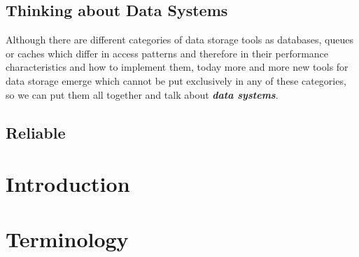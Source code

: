 \documentclass{article}
\begin{document}
\begin{adjustwidth}{2em}{2em}
		\subsection{Thinking about Data Systems}
		\begin{adjustwidth}{2em}{2em}
			Although there are different categories of data storage tools as databases, queues or caches which differ in access patterns and therefore in their performance characteristics and how to implement them, today more and more new tools for data storage emerge which cannot be put exclusively in any of these categories, so we can put them all together and talk about \textit{\textbf{data systems}}.
		\end{adjustwidth}
		\subsection{Reliable}
		\begin{adjustwidth}{2em}{2em}
		\end{adjustwidth}
	\end{adjustwidth}
	
	
	\newpage\null\thispagestyle{empty}
	\newpage
	\setcounter{section}{0}
	
	
	\section{Introduction}
	\begin{adjustwidth}{2em}{2em}
	\end{adjustwidth}
	
	
	\newpage\null\thispagestyle{empty}
	\newpage
	\setcounter{section}{0}
	
	
	\section{Terminology}
	\begin{adjustwidth}{2em}{2em}
	\end{adjustwidth}
	
\end{document}
